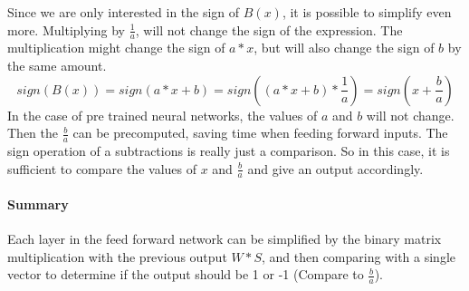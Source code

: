 \documentclass[a4paper, twoside, titlepage, 11pt]{article}
\begin{document}
	Since we are only interested in the sign of \(B(x)\), it is possible to simplify even more. Multiplying by \(\frac{1}{a}\), will not change the sign of the expression. The multiplication might change the sign of \(a * x\), but will also change the sign of \(b\) by the same amount.
	\begin{equation}
		sign(B(x)) = sign(a * x + b) = sign((a * x + b) * \frac{1}{a}) = sign(x + \frac{b}{a})
	\end{equation}
	In the case of pre trained neural networks, the values of \(a\) and \(b\) will not change. Then the \(\frac{b}{a}\) can be precomputed, saving time when feeding forward inputs.  The sign operation of a subtractions is really just a comparison. So in this case, it is sufficient to compare the values of \(x\) and \(\frac{b}{a}\) and give an output accordingly.
	
	\paragraph{Summary}
	Each layer in the feed forward network can be simplified by the binary matrix multiplication with the previous output \(W * S\), and then comparing with a single vector to determine if the output should be 1 or -1 (Compare to \(\frac{b}{a}\)).
	
\end{document}
